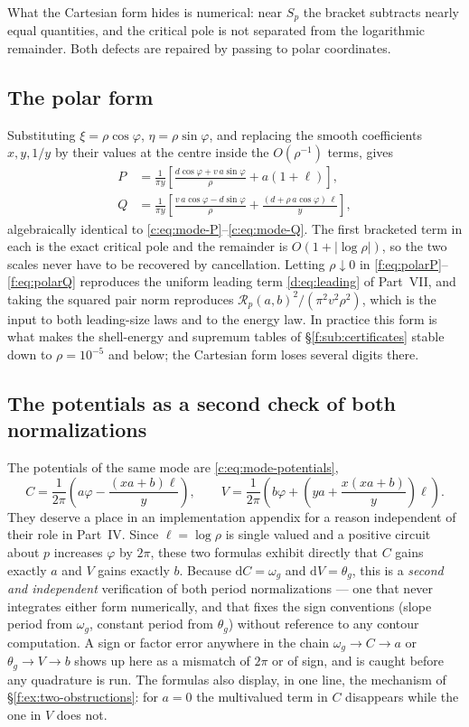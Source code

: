 \documentclass[11pt,a4paper]{article}
\numberwithin{equation}{section}
\theoremstyle{definition}
\theoremstyle{remark}
\theoremstyle{plain}
\newcommand{\om}{\omega}
\newcommand{\thet}{\theta}
\newcommand{\pot}{C}          %
\newcommand{\potV}{V}         %
\newcommand{\Sp}{S_{p}}
\newcommand{\Rp}{\mathcal R_{p}}      %
\newcommand{\abs}[1]{\lvert #1\rvert}
\newcommand{\dd}{\mathrm d}
\begin{document}
What the Cartesian form hides is numerical: near $\Sp$ the bracket
subtracts nearly equal quantities, and the critical pole is not separated
from the logarithmic remainder. Both defects are repaired by passing to
polar coordinates.

\subsection{The polar form}

Substituting $\xi=\rho\cos\varphi$, $\eta=\rho\sin\varphi$, and replacing
the smooth coefficients $x,y,1/y$ by their values at the centre inside the
$O(\rho^{-1})$ terms, gives
\begin{align}
 P&=\frac{1}{\pi y}\left[
   \frac{d\cos\varphi+v\,a\sin\varphi}{\rho}+a(1+\ell)\right],
 \label{f:eq:polarP}\\
 Q&=\frac{1}{\pi y}\left[
   \frac{v\,a\cos\varphi-d\sin\varphi}{\rho}
   +\frac{(d+\rho\,a\cos\varphi)\,\ell}{y}\right],
 \label{f:eq:polarQ}
\end{align}
algebraically identical to \eqref{c:eq:mode-P}--\eqref{c:eq:mode-Q}. The
first bracketed term in each is the exact critical pole and the remainder
is $O(1+\abs{\log\rho})$, so the two scales never have to be recovered by
cancellation. Letting $\rho\downarrow0$ in
\eqref{f:eq:polarP}--\eqref{f:eq:polarQ} reproduces the uniform leading
term \eqref{d:eq:leading} of Part~VII, and taking the squared pair norm
reproduces $\Rp(a,b)^2/(\pi^2v^2\rho^2)$, which is the input to both
leading-size laws and to the energy law. In practice this form is what
makes the shell-energy and supremum tables of \S\ref{f:sub:certificates}
stable down to $\rho=10^{-5}$ and below; the Cartesian form loses several
digits there.

\subsection{The potentials as a second check of both normalizations}

The potentials of the same mode are \eqref{c:eq:mode-potentials},
\[
 \pot=\frac{1}{2\pi}\left(a\varphi-\frac{(xa+b)\ell}{y}\right),
 \qquad
 \potV=\frac{1}{2\pi}\left(b\varphi
   +\left(ya+\frac{x(xa+b)}{y}\right)\ell\right).
\]
They deserve a place in an implementation appendix for a reason
independent of their role in Part~IV. Since $\ell=\log\rho$ is single
valued and a positive circuit about $p$ increases $\varphi$ by $2\pi$,
these two formulas exhibit directly that $\pot$ gains exactly $a$ and
$\potV$ gains exactly $b$. Because $\dd\pot=\om_g$ and $\dd\potV=\thet_g$,
this is a \emph{second and independent} verification of both period
normalizations --- one that never integrates either form numerically, and
that fixes the sign conventions (slope period from $\om_g$, constant period
from $\thet_g$) without reference to any contour computation. A sign or
factor error anywhere in the chain
$\om_g\to\pot\to a$ or $\thet_g\to\potV\to b$ shows up here as a mismatch
of $2\pi$ or of sign, and is caught before any quadrature is run. The
formulas also display, in one line, the mechanism of
\S\ref{f:ex:two-obstructions}: for $a=0$ the multivalued term in $\pot$
disappears while the one in $\potV$ does not.
\end{document}
